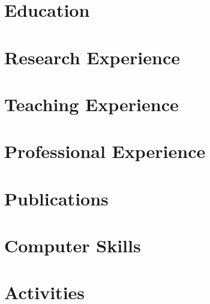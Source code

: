 \documentclass[letterpaper,11pt]{article}
\begin{document}
    

%     

\section{Education}
    
    
    

\section{Research Experience}
    
    

\section{Teaching Experience}
    
    
    
    

\section{Professional Experience}
    
    
    

\section{Publications}
    

\section{Computer Skills}
    
    
    

\section{Activities}
    
\end{document}
